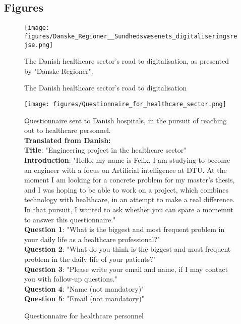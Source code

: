 \subsection{Figures}
\begin{figure}[H]
    \centering
    \texttt{[image: figures/Danske\_Regioner\_\_Sundhedsvæsenets\_digitaliseringsrejse.png]}
    \caption{The Danish healthcare sector's road to digitalisation}
    \medskip
    \small
    \raggedright
    The Danish healthcare sector's road to digitalisation, as presented by "Danske Regioner"\cite{Den-Reg-digitalisation}.
    \label{fig:healthcare_digitalisation}
\end{figure}

\begin{figure}[H]
    \centering
    \texttt{[image: figures/Questionnaire\_for\_healthcare\_sector.png]}
    \caption{Questionnaire for healthcare personnel}
    \medskip
    \small
    \raggedright
    Questionnaire sent to Danish hospitals, in the pursuit of reaching out to healthcare personnel.
    \\
    \textbf{Translated from Danish:}
    \\
    \textbf{Title}: "Engineering project in the healthcare sector"
    \\
    \textbf{Introduction}: "Hello, my name is Felix, I am studying to become an engineer with a focus on Artificial intelligence at DTU. At the moment I am looking for a concrete problem for my master's thesis, and I was hoping to be able to work on a project, which combines technology with healthcare, in an attempt to make a real difference. In that pursuit, I wanted to ask whether you can spare a momemnt to answer this questionnaire." 
    \\
    \textbf{Question 1}: "What is the biggest and most frequent problem in your daily life as a healthcare professional?"
    \\
    \textbf{Question 2}: "What do you think is the biggest and most frequent problem in the daily life of your patients?"
    \\
    \textbf{Question 3}: "Please write your email and name, if I may contact you with follow-up questions."
    \\
    \textbf{Question 4}: "Name (not mandatory)"
    \\
    \textbf{Question 5}: "Email (not mandatory)"
    \label{fig:questionnaire_healthcare_personnel}
\end{figure}